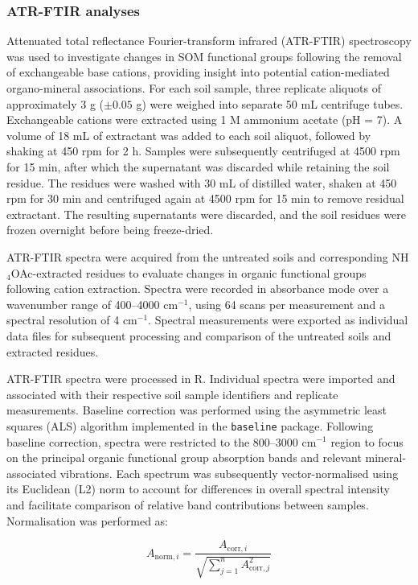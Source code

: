 \documentclass[preprint,12pt]{elsarticle}
\begin{document}
\subsubsection{ATR-FTIR analyses}

Attenuated total reflectance Fourier-transform infrared (ATR-FTIR) spectroscopy was used to investigate changes in SOM functional groups following the removal of exchangeable base cations, providing insight into potential cation-mediated organo-mineral associations. For each soil sample, three replicate aliquots of approximately 3 g ($\pm 0.05$ g) were weighed into separate 50 mL centrifuge tubes. Exchangeable cations were extracted using 1 M ammonium acetate (pH = 7). A volume of 18 mL of extractant was added to each soil aliquot, followed by shaking at 450 rpm for 2 h. Samples were subsequently centrifuged at 4500 rpm for 15 min, after which the supernatant was discarded while retaining the soil residue. The residues were washed with 30 mL of distilled water, shaken at 450 rpm for 30 min and centrifuged again at 4500 rpm for 15 min to remove residual extractant. The resulting supernatants were discarded, and the soil residues were frozen overnight before being freeze-dried.

ATR-FTIR spectra were acquired from the untreated soils and corresponding NH$_4$OAc-extracted residues to evaluate changes in organic functional groups following cation extraction. Spectra were recorded in absorbance mode over a wavenumber range of 400--4000 cm$^{-1}$, using 64 scans per measurement and a spectral resolution of 4 cm$^{-1}$. Spectral measurements were exported as individual data files for subsequent processing and comparison of the untreated soils and extracted residues.

ATR-FTIR spectra were processed in R. Individual spectra were imported and associated with their respective soil sample identifiers and replicate measurements. Baseline correction was performed using the asymmetric least squares (ALS) algorithm implemented in the \texttt{baseline} package. Following baseline correction, spectra were restricted to the 800--3000 cm$^{-1}$ region to focus on the principal organic functional group absorption bands and relevant mineral-associated vibrations. Each spectrum was subsequently vector-normalised using its Euclidean (L2) norm to account for differences in overall spectral intensity and facilitate comparison of relative band contributions between samples. Normalisation was performed as:

\begin{equation}
A_{\mathrm{norm},i} =
\frac{A_{\mathrm{corr},i}}
{\sqrt{\displaystyle\sum_{j=1}^{n} A_{\mathrm{corr},j}^{2}}}
\label{eq:ftir_vector_normalisation}
\end{equation}
\end{document}
